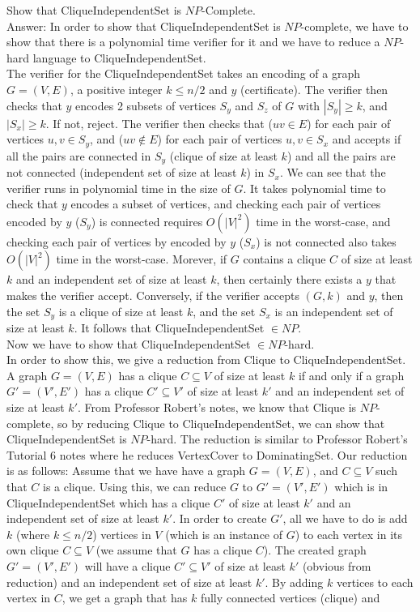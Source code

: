 \documentclass{csc_assignment}
\begin{document}
\begin{description}
  Show that $\mathrm{CliqueIndependentSet}$ is $NP$-Complete. \\
  Answer: In order to show that CliqueIndependentSet is $NP$-complete, we have to show that there is a polynomial time verifier for it and we have to reduce a $NP$-hard language to CliqueIndependentSet. \\ The verifier for the CliqueIndependentSet takes an encoding of a graph $G = (V, E)$, a positive integer $k \leq n/2$ and $y$ (certificate). The verifier then checks that $y$ encodes 2 subsets of vertices $S_{y}$ and $S_{z}$ of $G$ with $|S_{y}| \ge k$, and $|S_{x}| \ge k$. If not, reject. The verifier then checks that ($uv \in E$) for each pair of vertices $u, v \in S_{y}$, and ($uv \notin E$) for each pair of vertices $u, v \in S_{x}$ and accepts if all the pairs are connected in $S_{y}$ (clique of size at least $k$) and all the pairs are not connected (independent set of size at least $k$) in $S_{x}$. We can see that the verifier runs in polynomial time in the size of $G$. It takes polynomial time to check that $y$ encodes a subset of vertices, and checking each pair of vertices encoded by $y$ ($S_{y}$) is connected requires $O(|V|^{2})$ time in the worst-case, and checking each pair of vertices by encoded by $y$ ($S_{x}$) is not connected also takes $O(|V|^{2})$ time in the worst-case. Morever, if $G$ contains a clique $C$ of size at least $k$ and an independent set of size at least $k$, then certainly there exists a $y$ that makes the verifier accept. Conversely, if the verifier accepts $(G, k)$ and $y$, then the set $S_{y}$ is a clique of size at least $k$, and the set $S_{x}$ is an independent set of size at least $k$. It follows that CliqueIndependentSet $\in NP$. \\ Now we have to show that CliqueIndependentSet $\in NP$-hard. \\ In order to show this, we give a reduction from Clique to CliqueIndependentSet. \\ A graph $G = (V, E)$ has a clique $C \subseteq V$ of size at least $k$ if and only if a graph $G' = (V', E')$ has a clique $C' \subseteq V'$ of size at least $k'$ and an independent set of size at least $k'$. From Professor Robert's notes, we know that Clique is $NP$-complete, so by reducing Clique to CliqueIndependentSet, we can show that CliqueIndependentSet is $NP$-hard. The reduction is similar to Professor Robert's Tutorial 6 notes where he reduces VertexCover to DominatingSet. Our reduction is as follows: Assume that we have have a graph $G = (V, E)$, and $C \subseteq V$ such that $C$ is a clique. Using this, we can reduce $G$ to $G' = (V', E')$ which is in CliqueIndependentSet which has a clique $C'$ of size at least $k'$ and an independent set of size at least $k'$. In order to create $G'$, all we have to do is add $k$ (where $k \leq n/2$) vertices in $V$ (which is an instance of $G$) to each vertex in its own clique $C \subseteq V$ (we assume that $G$ has a clique $C$). The created graph $G' = (V', E')$ will have a clique $C' \subseteq V'$ of size at least $k'$ (obvious from reduction) and an independent set of size at least $k'$. By adding $k$ vertices to each vertex in $C$, we get a graph that has $k$ fully connected vertices (clique) and 
\end{description}
\end{document}
